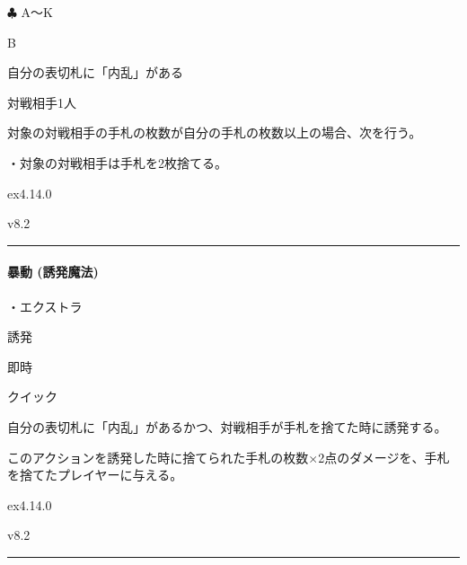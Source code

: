 \documentclass[letterpaper,10pt,dvipdfmx]{sphinxmanual}
\begin{document}
\sphinxAtStartPar
{} {\normalsize $\clubsuit$} A〜K

\sphinxAtStartPar
{} B

\sphinxAtStartPar
{}

\sphinxAtStartPar
自分の表切札に「内乱」がある

\sphinxAtStartPar
{}

\sphinxAtStartPar
対戦相手1人

\sphinxAtStartPar
{}

\sphinxAtStartPar
対象の対戦相手の手札の枚数が自分の手札の枚数以上の場合、次を行う。

\sphinxAtStartPar
・対象の対戦相手は手札を2枚捨てる。

\sphinxAtStartPar
{}  ex4.14.0

\sphinxAtStartPar
{}  v8.2


\bigskip\hrule\bigskip



\paragraph{暴動 (誘発魔法)}
\label{\detokenize{auto/frameActionlist:act-riot}}\label{\detokenize{auto/frameActionlist:id73}}
\sphinxAtStartPar
{}

\sphinxAtStartPar
・エクストラ

\sphinxAtStartPar
{} 誘発

\sphinxAtStartPar
{} 即時

\sphinxAtStartPar
{} クイック

\sphinxAtStartPar
{}

\sphinxAtStartPar
自分の表切札に「内乱」があるかつ、対戦相手が手札を捨てた時に誘発する。

\sphinxAtStartPar
{}

\sphinxAtStartPar
このアクションを誘発した時に捨てられた手札の枚数×2点のダメージを、手札を捨てたプレイヤーに与える。

\sphinxAtStartPar
{}  ex4.14.0

\sphinxAtStartPar
{}  v8.2


\bigskip\hrule\bigskip
\end{document}
